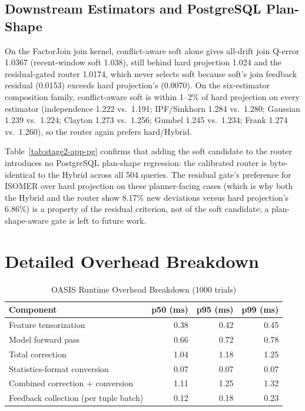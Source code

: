 \documentclass[runningheads]{llncs}
\begin{document}
\subsection{Downstream Estimators and PostgreSQL Plan-Shape}

On the FactorJoin join kernel, conflict-aware soft alone gives all-drift join
Q-error 1.0367 (recent-window soft 1.038), still behind hard projection 1.024
and the residual-gated router 1.0174, which never selects soft because soft's
join feedback residual (0.0153) exceeds hard projection's (0.0070). On the
six-estimator composition family, conflict-aware soft is within 1--2\% of hard
projection on every estimator (independence 1.222 vs.\ 1.191; IPF/Sinkhorn 1.284
vs.\ 1.280; Gaussian 1.239 vs.\ 1.224; Clayton 1.273 vs.\ 1.256; Gumbel 1.245
vs.\ 1.234; Frank 1.274 vs.\ 1.260), so the router again prefers hard/Hybrid.



Table~\ref{tab:stage2-app-pg} confirms that adding the soft candidate to the
router introduces no PostgreSQL plan-shape regression: the calibrated router is
byte-identical to the Hybrid across all 504 queries. The residual gate's
preference for ISOMER over hard projection on these planner-facing cases (which
is why both the Hybrid and the router show 8.17\% new deviations versus hard
projection's 6.86\%) is a property of the residual criterion, not of the soft
candidate; a plan-shape-aware gate is left to future work.

\section{Detailed Overhead Breakdown}
\label{sec:overhead-app}

\begin{table}[h]
\centering
\caption{OASIS Runtime Overhead Breakdown (1000 trials)}
\label{tab:overhead}
\begin{tabular}{l r r r}
\toprule
Component & p50 (ms) & p95 (ms) & p99 (ms) \\
\midrule
Feature tensorization       & 0.38 & 0.42 & 0.45 \\
Model forward pass          & 0.66 & 0.72 & 0.78 \\
Total correction            & 1.04 & 1.18 & 1.25 \\
Statistics-format conversion & 0.07 & 0.07 & 0.07 \\
Combined correction + conversion & 1.11 & 1.25 & 1.32 \\
\midrule
Feedback collection (per tuple batch) & 0.12 & 0.18 & 0.23 \\
\bottomrule
\end{tabular}
\end{table}
\end{document}

